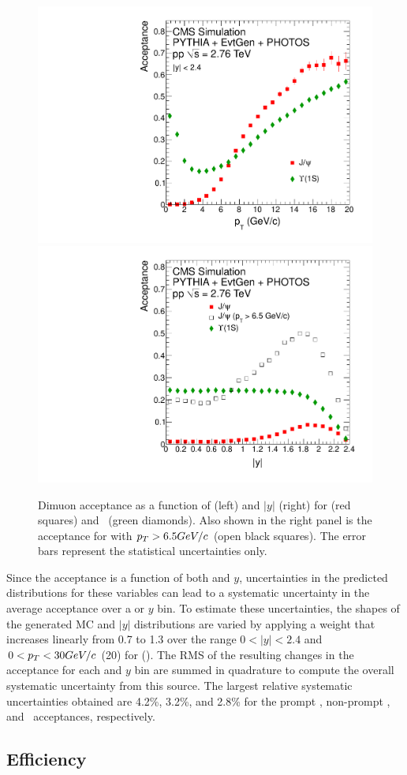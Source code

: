 \begin{figure}[htbp]
  \centering
  \includegraphics[width=0.45\linewidth]{chap_YInPbPbColl2010_figures/acc_pt_promptJpsi}
  \includegraphics[width=0.45\linewidth]{chap_YInPbPbColl2010_figures/acc_y_promptJpsi}
  \caption{Dimuon acceptance as a function of \pt (left) and $|y|$
    (right) for \Jpsi (red squares) and \PgUa\ (green diamonds). Also
    shown in the right panel is the acceptance for \Jpsi with
    $p_T>6.5GeV/c$ (open black squares). The error bars represent the
    statistical uncertainties only.}
  \label{fig:acceptance}
\end{figure}
Since the acceptance is a function of both \pt and $y$, uncertainties
in the predicted distributions for these variables can lead to a
systematic uncertainty in the average acceptance over a \pt or $y$
bin.  To estimate these uncertainties, the shapes of the generated MC
\pt and $|y|$ distributions are varied by applying a weight that
increases linearly from 0.7 to 1.3 over the range $0<|y|<2.4$ and
$0<p_T<30GeV/c$ (20\GeVc) for \Jpsi (\PgUa).  The RMS of the resulting
changes in the acceptance for each \pt and $y$ bin are summed in
quadrature to compute the overall systematic uncertainty from this
source.  The largest relative systematic uncertainties obtained are
4.2\%, 3.2\%, and 2.8\% for the prompt \Jpsi, non-prompt \Jpsi, and
\PgUa\ acceptances, respectively.

\subsection{Efficiency}
\label{sec:eff}

